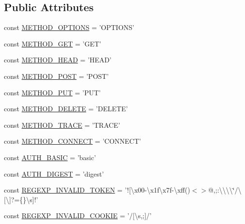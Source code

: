 \subsection*{Public Attributes}
\begin{DoxyCompactItemize}
\item 
const \hyperlink{classHTTP__Request2_a65c57cec36149d220f6cd30d43eb59b7}{M\-E\-T\-H\-O\-D\-\_\-\-O\-P\-T\-I\-O\-N\-S} = 'O\-P\-T\-I\-O\-N\-S'
\item 
const \hyperlink{classHTTP__Request2_a7c1f37cc2543c9d0fe5f09086bd50b3a}{M\-E\-T\-H\-O\-D\-\_\-\-G\-E\-T} = 'G\-E\-T'
\item 
const \hyperlink{classHTTP__Request2_abb68a728946a9da5f19d5bb0cf676d58}{M\-E\-T\-H\-O\-D\-\_\-\-H\-E\-A\-D} = 'H\-E\-A\-D'
\item 
const \hyperlink{classHTTP__Request2_ae42a6ae396ef8abacf8e54a64a64df22}{M\-E\-T\-H\-O\-D\-\_\-\-P\-O\-S\-T} = 'P\-O\-S\-T'
\item 
const \hyperlink{classHTTP__Request2_a02fd90821d762476b8ec1e226c374174}{M\-E\-T\-H\-O\-D\-\_\-\-P\-U\-T} = 'P\-U\-T'
\item 
const \hyperlink{classHTTP__Request2_ab6edf309179aa4535aa6a9b12b260978}{M\-E\-T\-H\-O\-D\-\_\-\-D\-E\-L\-E\-T\-E} = 'D\-E\-L\-E\-T\-E'
\item 
const \hyperlink{classHTTP__Request2_a9877a1980431a869bce427ec64c923eb}{M\-E\-T\-H\-O\-D\-\_\-\-T\-R\-A\-C\-E} = 'T\-R\-A\-C\-E'
\item 
const \hyperlink{classHTTP__Request2_af03c573103c3f5bdf3ec9c3e95a08e59}{M\-E\-T\-H\-O\-D\-\_\-\-C\-O\-N\-N\-E\-C\-T} = 'C\-O\-N\-N\-E\-C\-T'
\item 
const \hyperlink{classHTTP__Request2_a2282d82f67f929d936b2b2b6c2317dd1}{A\-U\-T\-H\-\_\-\-B\-A\-S\-I\-C} = 'basic'
\item 
const \hyperlink{classHTTP__Request2_a4b05b6842e05183dc3ac3c7ff613b3c7}{A\-U\-T\-H\-\_\-\-D\-I\-G\-E\-S\-T} = 'digest'
\item 
const \hyperlink{classHTTP__Request2_a73691a6fc7003599b47be20a8c728bbf}{R\-E\-G\-E\-X\-P\-\_\-\-I\-N\-V\-A\-L\-I\-D\-\_\-\-T\-O\-K\-E\-N} = '!\mbox{[}\textbackslash{}x00-\/\textbackslash{}x1f\textbackslash{}x7f-\/\textbackslash{}xff()$<$$>$@,;\-:\textbackslash{}\textbackslash{}\textbackslash{}\textbackslash{}\char`\"{}/\textbackslash{}\mbox{[}\textbackslash{}\mbox{]}?=\{\}\textbackslash{}s\mbox{]}!'
\item 
const \hyperlink{classHTTP__Request2_ab7fc574a0035ac8e940f6cd3456b0c28}{R\-E\-G\-E\-X\-P\-\_\-\-I\-N\-V\-A\-L\-I\-D\-\_\-\-C\-O\-O\-K\-I\-E} = '/\mbox{[}\textbackslash{}s,;\mbox{]}/'
\end{DoxyCompactItemize}
